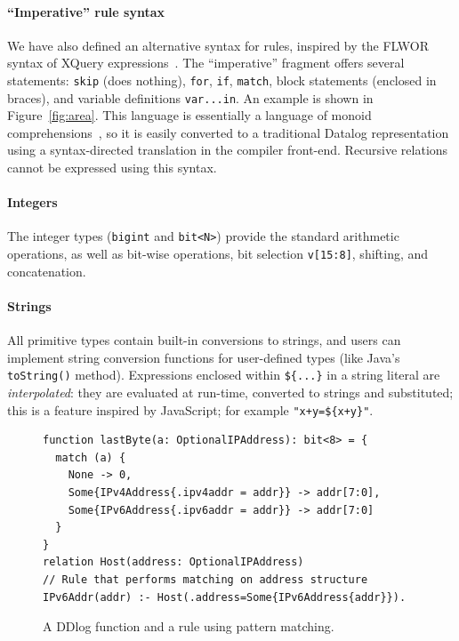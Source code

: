 \paragraph{``Imperative'' rule syntax}
We have also defined an alternative syntax for rules, inspired by the
FLWOR syntax of XQuery expressions~\cite{boag-xquery02}.  The
``imperative'' fragment offers several statements: \texttt{skip} (does
nothing), \texttt{for}, \texttt{if}, \texttt{match}, block statements
(enclosed in braces), and variable definitions \texttt{var...in}.  An
example is shown in Figure~\ref{fig:area}.  This language is
essentially a language of monoid
comprehensions~\cite{fegaras-sigmod95}, so it is easily converted to a
traditional Datalog representation using a syntax-directed translation
in the compiler front-end.  Recursive relations cannot be expressed
using this syntax.

\paragraph{Integers} The integer types (\texttt{bigint} and \texttt{bit<N>}) provide the
standard arithmetic operations, as well as bit-wise operations, bit
selection \texttt{v[15:8]}, shifting, and concatenation.

\paragraph{Strings} All primitive types contain built-in conversions to strings, and users
can implement string conversion functions for user-defined types (like
Java's \texttt{toString()} method).  Expressions enclosed within
\texttt{\$\{...\}} in a string literal are \emph{interpolated}: they
are evaluated at run-time, converted to strings and substituted; this
is a feature inspired by JavaScript; for example
\texttt{"x+y=\$\{x+y\}"}.

\begin{figure}[t]
  \footnotesize
  \begin{lstlisting}[language=ddlog]
function lastByte(a: OptionalIPAddress): bit<8> = {
  match (a) {
    None -> 0,
    Some{IPv4Address{.ipv4addr = addr}} -> addr[7:0],
    Some{IPv6Address{.ipv6addr = addr}} -> addr[7:0]
  }
}
relation Host(address: OptionalIPAddress)
// Rule that performs matching on address structure
IPv6Addr(addr) :- Host(.address=Some{IPv6Address{addr}}).
  \end{lstlisting}
\caption{A DDlog function and a rule using pattern
  matching.\label{fig:function}}
\end{figure}

